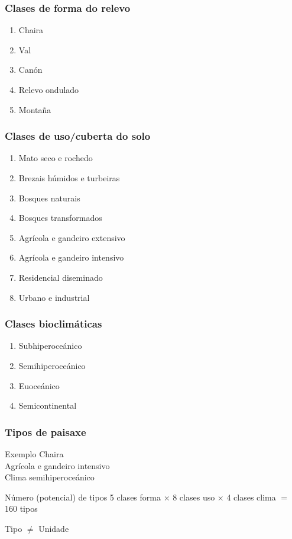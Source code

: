 \begin{frame}
\frametitle{Clases de forma do relevo}
  \begin{enumerate}
   \item Chaira
   \item Val
   \item Canón
   \item Relevo ondulado
   \item Montaña
  \end{enumerate}
\end{frame}



\begin{frame}
\frametitle{Clases de uso/cuberta do solo}
  \begin{enumerate}
   \item Mato seco e rochedo
   \item Brezais húmidos e turbeiras
   \item Bosques naturais
   \item Bosques transformados
   \item Agrícola e gandeiro extensivo
   \item Agrícola e gandeiro intensivo
   \item Residencial diseminado
   \item Urbano e industrial
  \end{enumerate}
\end{frame}



\begin{frame}
\frametitle{Clases bioclimáticas}
  \begin{enumerate}
   \item Subhiperoceánico
   \item Semihiperoceánico
   \item Euoceánico
   \item Semicontinental
  \end{enumerate}
\end{frame}

\begin{frame}
\frametitle{Tipos de paisaxe}
 \begin{block}{Exemplo}
 Chaira\\
 Agrícola e gandeiro intensivo\\
 Clima semihiperoceánico
 \end{block}
 
 \pause
 \begin{block}{Número (potencial) de tipos}
 5 clases forma $\times$ 8 clases uso $\times$ 4 clases clima $ = $ 160 tipos

 \bigskip
 Tipo $\neq$ Unidade
 \end{block}
\end{frame}


